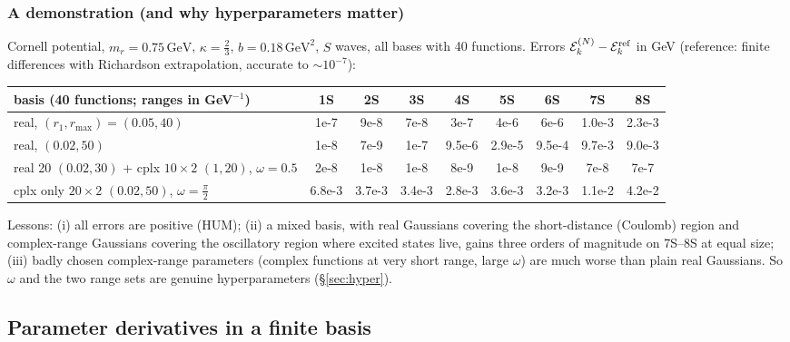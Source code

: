 \documentclass[11pt,a4paper]{article}
\numberwithin{equation}{section}
\theoremstyle{definition}
\theoremstyle{plain}
\theoremstyle{remark}
\numberwithin{algorithm}{section}
\newcommand{\mr}{m_r}
\newcommand{\GeV}{\,\mathrm{GeV}}
\begin{document}
\subsubsection{A demonstration (and why hyperparameters matter)}
Cornell potential, $\mr=0.75\GeV$, $\kappa=\frac23$, $b=0.18\GeV^2$, $S$ waves, all bases with 40 functions. Errors $\mathcal E_k^{(N)}-\mathcal E_k^{\rm ref}$ in GeV (reference: finite differences with Richardson extrapolation, accurate to $\sim10^{-7}$):
\begin{center}\small
{\footnotesize\setlength{\tabcolsep}{3.5pt}
\begin{tabular}{@{}lcccccccc@{}}\toprule
basis (40 functions; ranges in GeV$^{-1}$) & 1S & 2S & 3S & 4S & 5S & 6S & 7S & 8S\\\midrule
real, $(r_1,r_{\max})=(0.05,40)$ & 1e-7 & 9e-8 & 7e-8 & 3e-7 & 4e-6 & 6e-6 & 1.0e-3 & 2.3e-3\\
real, $(0.02,50)$ & 1e-8 & 7e-9 & 1e-7 & 9.5e-6 & 2.9e-5 & 9.5e-4 & 9.7e-3 & 9.0e-3\\
real 20 $(0.02,30)$ + cplx $10{\times}2$ $(1,20)$, $\omega{=}0.5$ & 2e-8 & 1e-8 & 1e-8 & 8e-9 & 1e-8 & 9e-9 & 7e-8 & 7e-7\\
cplx only $20{\times}2$ $(0.02,50)$, $\omega{=}\frac\pi2$ & 6.8e-3 & 3.7e-3 & 3.4e-3 & 2.8e-3 & 3.6e-3 & 3.2e-3 & 1.1e-2 & 4.2e-2\\\bottomrule
\end{tabular}}
\end{center}
Lessons: (i) all errors are positive (HUM); (ii) a mixed basis, with real Gaussians covering the short-distance (Coulomb) region and complex-range Gaussians covering the oscillatory region where excited states live, gains three orders of magnitude on 7S--8S at equal size; (iii) badly chosen complex-range parameters (complex functions at very short range, large $\omega$) are much worse than plain real Gaussians. So $\omega$ and the two range sets are genuine hyperparameters (\S\ref{sec:hyper}).

\subsection{Parameter derivatives in a finite basis}\label{sec:derivs}
\end{document}
